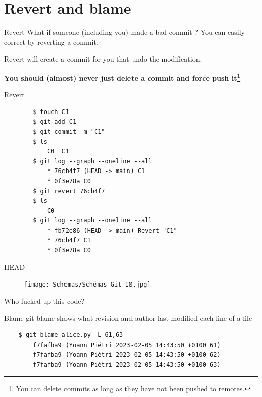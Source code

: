 \documentclass[10pt,aspectratio=169]{beamer}
\begin{document}
\section{Revert and blame}

\begin{frame}[fragile]{Revert}
    What if someone (including you) made a bad commit ? You can easily correct by reverting a commit.

    Revert will create a commit for you that undo the modification.

    \textbf{You should (almost) never just delete a commit and force push it\footnote{You can delete commits as long as they have not been pushed to remotes.}}
\end{frame}

\begin{frame}[fragile]{Revert}
    \begin{verbatim}
        $ touch C1
        $ git add C1
        $ git commit -m "C1"
        $ ls
            C0  C1
        $ git log --graph --oneline --all
            * 76cb4f7 (HEAD -> main) C1
            * 0f3e78a C0
        $ git revert 76cb4f7
        $ ls
            C0
        $ git log --graph --oneline --all
            * fb72e86 (HEAD -> main) Revert "C1"
            * 76cb4f7 C1
            * 0f3e78a C0
        \end{verbatim}
\end{frame}

\begin{frame}[fragile]{HEAD}
    \begin{figure}
        \texttt{[image: Schemas/Schémas Git-10.jpg]}
    \end{figure}
\end{frame}

{
\begin{frame}
    Who fucked up this code?
\end{frame}
}

\begin{frame}[fragile]{Blame}
    git blame shows what revision and author last modified each line of a file

    \begin{verbatim}
    $ git blame alice.py -L 61,63
        f7fafba9 (Yoann Piétri 2023-02-05 14:43:50 +0100 61)
        f7fafba9 (Yoann Piétri 2023-02-05 14:43:50 +0100 62)
        f7fafba9 (Yoann Piétri 2023-02-05 14:43:50 +0100 63)
    \end{verbatim}
\end{frame}
\end{document}

